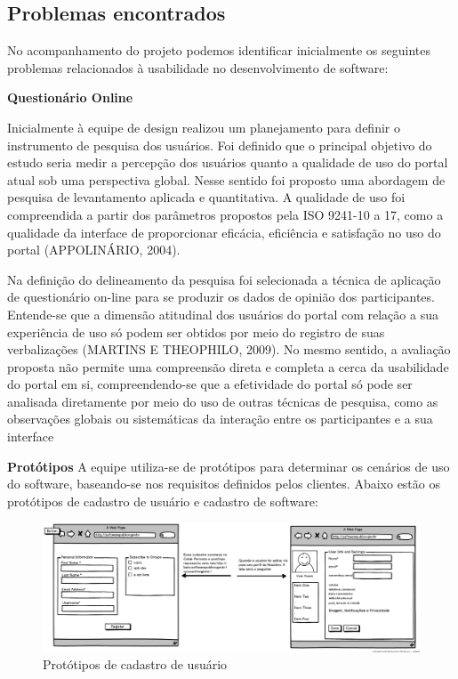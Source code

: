 \subsection{Problemas encontrados}

No acompanhamento do projeto podemos identificar inicialmente os seguintes problemas relacionados à usabilidade no desenvolvimento de software:

\textbf{Questionário Online}

Inicialmente à equipe de design realizou um planejamento para definir o instrumento de pesquisa dos usuários. Foi definido que o principal objetivo do estudo seria medir a percepção dos usuários quanto a qualidade de uso do portal atual sob uma perspectiva global. Nesse sentido foi proposto uma abordagem de pesquisa de levantamento aplicada e quantitativa. A qualidade de uso foi compreendida a partir dos parâmetros propostos pela ISO 9241-10 a 17, como a qualidade da interface de proporcionar eficácia, eficiência e satisfação no uso do portal (APPOLINÁRIO, 2004). 

Na definição do delineamento da pesquisa foi selecionada a técnica de aplicação de questionário on-line para se produzir os dados de opinião dos participantes. Entende-se que a dimensão atitudinal dos usuários do portal com relação a sua experiência de uso só podem ser obtidos por meio do registro de suas verbalizações (MARTINS E THEOPHILO, 2009). No mesmo sentido, a avaliação proposta não permite uma compreensão direta e completa a cerca da usabilidade do portal em si, compreendendo-se que a efetividade do portal só pode ser analisada 
diretamente por meio do uso de outras técnicas de pesquisa, como as observações globais ou sistemáticas da interação entre os participantes e a sua interface %

\textbf{Protótipos}
	A equipe utiliza-se de protótipos para determinar os cenários de uso do software, baseando-se nos requisitos definidos pelos clientes. Abaixo estão os protótipos de cadastro de usuário e cadastro de software:

	\begin{figure}[h!]
    	\centering
    	\includegraphics[keepaspectratio=true,scale=0.32]
      		{figuras/CadastroEdicaoUser.eps}
    	\caption{Protótipos de cadastro de usuário}
    	\label{cadastro_user}
	\end{figure}

